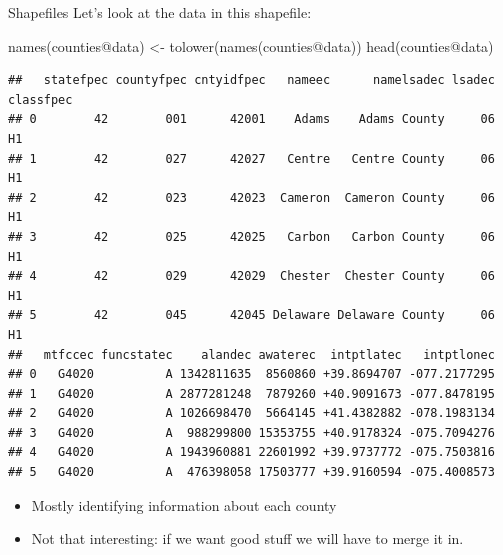 \documentclass[
  ignorenonframetext,
]{beamer}
\newenvironment{Shaded}{\begin{snugshade}}{\end{snugshade}}
\newcommand{\FunctionTok}[1]{\textcolor[rgb]{0.00,0.00,0.00}{#1}}
\newcommand{\NormalTok}[1]{#1}
\newcommand{\OtherTok}[1]{\textcolor[rgb]{0.56,0.35,0.01}{#1}}
\newcommand{\SpecialCharTok}[1]{\textcolor[rgb]{0.00,0.00,0.00}{#1}}
\begin{document}
\begin{frame}[fragile]{Shapefiles}
\protect\hypertarget{shapefiles-2}{}
Let's look at the data in this shapefile: \tiny

\begin{Shaded}
\begin{Highlighting}[]
\FunctionTok{names}\NormalTok{(counties}\SpecialCharTok{@}\NormalTok{data) }\OtherTok{\textless{}{-}} \FunctionTok{tolower}\NormalTok{(}\FunctionTok{names}\NormalTok{(counties}\SpecialCharTok{@}\NormalTok{data))}
\FunctionTok{head}\NormalTok{(counties}\SpecialCharTok{@}\NormalTok{data)}
\end{Highlighting}
\end{Shaded}

\begin{verbatim}
##   statefpec countyfpec cntyidfpec   nameec      namelsadec lsadec classfpec
## 0        42        001      42001    Adams    Adams County     06        H1
## 1        42        027      42027   Centre   Centre County     06        H1
## 2        42        023      42023  Cameron  Cameron County     06        H1
## 3        42        025      42025   Carbon   Carbon County     06        H1
## 4        42        029      42029  Chester  Chester County     06        H1
## 5        42        045      42045 Delaware Delaware County     06        H1
##   mtfccec funcstatec    alandec awaterec  intptlatec   intptlonec
## 0   G4020          A 1342811635  8560860 +39.8694707 -077.2177295
## 1   G4020          A 2877281248  7879260 +40.9091673 -077.8478195
## 2   G4020          A 1026698470  5664145 +41.4382882 -078.1983134
## 3   G4020          A  988299800 15353755 +40.9178324 -075.7094276
## 4   G4020          A 1943960881 22601992 +39.9737772 -075.7503816
## 5   G4020          A  476398058 17503777 +39.9160594 -075.4008573
\end{verbatim}

\normalsize

\begin{itemize}
\item
  Mostly identifying information about each county
\item
  Not that interesting: if we want good stuff we will have to merge it
  in.
\end{itemize}
\end{frame}
\end{document}
